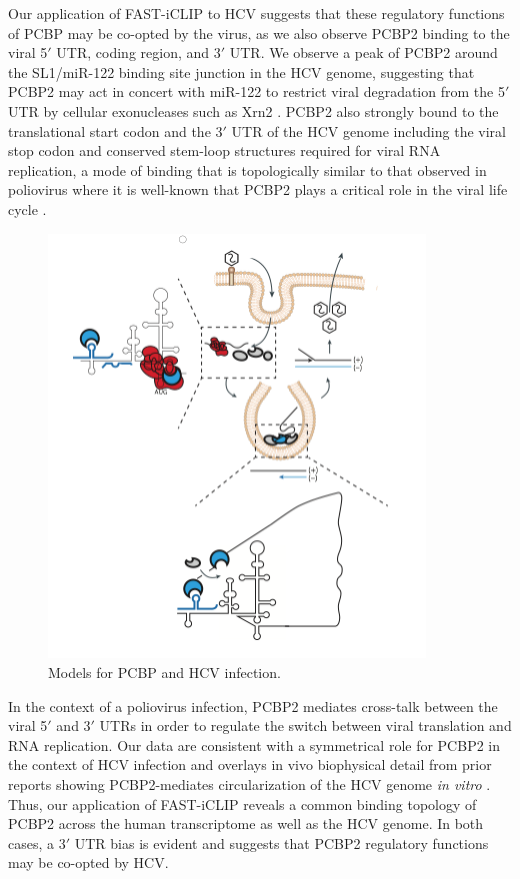 Our application of FAST-iCLIP to HCV suggests that these regulatory functions of PCBP may be co-opted by the virus, as we also observe PCBP2 binding to the viral 5$'$ UTR, coding region, and 3$'$ UTR. We observe a peak of PCBP2 around the SL1/miR-122 binding site junction in the HCV genome, suggesting that PCBP2 may act in concert with miR-122 to restrict viral degradation from the 5$'$ UTR by cellular exonucleases such as Xrn2  \cite{GarciaSastre:2013ko}. PCBP2 also strongly bound to the translational start codon and the 3$'$ UTR of the HCV genome including the viral stop codon and conserved stem-loop structures required for viral RNA replication, a mode of binding that is topologically similar to that observed in poliovirus where it is well-known that PCBP2 plays a critical role in the viral life cycle \cite{Flynn:2014bi}.

\begin{figure}
\center\includegraphics[width=100mm,scale=0.5]{Figures/Fig22}
\caption{Models for PCBP and HCV infection.}
\label{fig:Fig22}
\end{figure}

In the context of a poliovirus infection, PCBP2 mediates cross-talk between the viral 5$'$ and 3$'$ UTRs in order to regulate the switch between viral translation and RNA replication. Our data are consistent with a symmetrical role for PCBP2 in the context of HCV infection and overlays in vivo biophysical detail from prior reports showing PCBP2-mediates circularization of the HCV genome \emph{in vitro}  \cite{Flynn:2014bi}. Thus, our application of FAST-iCLIP reveals a common binding topology of PCBP2 across the human transcriptome as well as the HCV genome. In both cases, a 3$'$ UTR bias is evident and suggests that PCBP2 regulatory functions may be co-opted by HCV.

